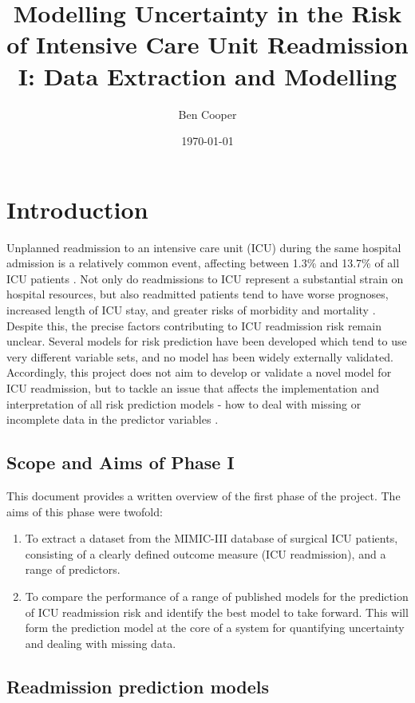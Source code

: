 \documentclass[onecolumn]{article}
\title{Modelling Uncertainty in the Risk of Intensive Care Unit Readmission I: Data Extraction and Modelling}
\date{\today}
\author{Ben Cooper}
\begin{document}
\maketitle

\section{Introduction}

Unplanned readmission to an intensive care unit (ICU) during the same hospital admission is a relatively common event, affecting between 1.3\% and 13.7\% of all ICU patients \citep{Elliott2014}. Not only do readmissions to ICU represent a substantial strain on hospital resources, but also readmitted patients tend to have worse prognoses, increased length of ICU stay, and greater risks of morbidity and mortality \citep{MarkaziMoghaddam2020}. Despite this, the precise factors contributing to ICU readmission risk remain unclear. Several models for risk prediction have been developed which tend to use very different variable sets, and no model has been widely externally validated. Accordingly, this project does not aim to develop or validate a novel model for ICU readmission, but to tackle an issue that affects the implementation and interpretation of all risk prediction models - how to deal with missing or incomplete data in the predictor variables \citep{Steyerberg2008}.

\subsection{Scope and Aims of Phase I}

This document provides a written overview of the first phase of the project. The aims of this phase were twofold:

\begin{enumerate}
\item To extract a dataset from the MIMIC-III database of surgical ICU patients, consisting of a clearly defined outcome measure (ICU readmission), and a range of predictors.
\item To compare the performance of a range of published models for the prediction of ICU readmission risk and identify the best model to take forward. This will form the prediction model at the core of a system for quantifying uncertainty and dealing with missing data.
\end{enumerate}


\subsection{Readmission prediction models}
\end{document}
